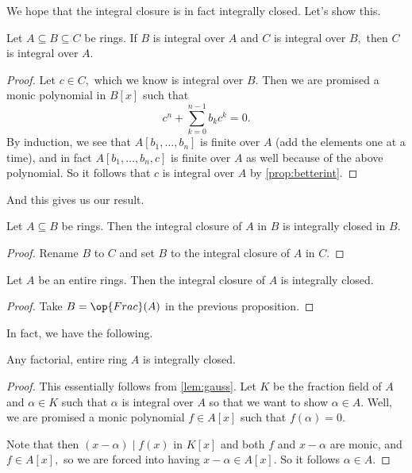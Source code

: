 \documentclass[../notes.tex]{subfiles}
\begin{document}
We hope that the integral closure is in fact integrally closed. Let's show this.
\begin{lem}
    Let $A\subseteq B\subseteq C$ be rings. If $B$ is integral over $A$ and $C$ is integral over $B,$ then $C$ is integral over $A.$
\end{lem}
\begin{proof}
    Let $c\in C,$ which we know is integral over $B.$ Then we are promised a monic polynomial in $B[x]$ such that
    \[c^n+\sum_{k=0}^{n-1}b_kc^k=0.\]
    By induction, we see that $A[b_1,\ldots,b_n]$ is finite over $A$ (add the elements one at a time), and in fact $A[b_1,\ldots,b_n,c]$ is finite over $A$ as well because of the above polynomial. So it follows that $c$ is integral over $A$ by \autoref{prop:betterint}.
\end{proof}
And this gives us our result.
\begin{prop}
    Let $A\subseteq B$ be rings. Then the integral closure of $A$ in $B$ is integrally closed in $B.$
\end{prop}
\begin{proof}
    Rename $B$ to $C$ and set $B$ to the integral closure of $A$ in $C.$
\end{proof}
\begin{prop}
    Let $A$ be an entire rings. Then the integral closure of $A$ is integrally closed.
\end{prop}
\begin{proof}
    Take $B=\op{Frac}(A)$ in the previous proposition.
\end{proof}
In fact, we have the following.
\begin{prop}
    Any factorial, entire ring $A$ is integrally closed.
\end{prop}
\begin{proof}
    This essentially follows from \autoref{lem:gauss}. Let $K$ be the fraction field of $A$ and $\alpha\in K$ such that $\alpha$ is integral over $A$ so that we want to show $\alpha\in A.$ Well, we are promised a monic polynomial $f\in A[x]$ such that $f(\alpha)=0.$
    
    Note that then $(x-\alpha)\mid f(x)$ in $K[x]$ and both $f$ and $x-\alpha$ are monic, and $f\in A[x],$ so we are forced into having $x-\alpha\in A[x].$ So it follows $\alpha\in A.$
\end{proof}
\end{document}
